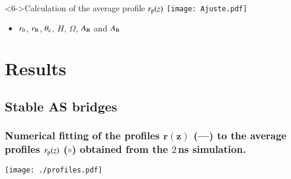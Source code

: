 \documentclass[8pt]{beamer}
\begin{document}
\begin{frame}
\begin{minipage}{0.46\textwidth}
\begin{block}
		    \end{block}  	   		
	   \end{minipage}		
	   ~~
  	   \begin{minipage}{0.505\textwidth}
  	   		\begin{block}{Calculation of the average profile $r_{\rm p}(z)$}
	    	\texttt{[image: Ajuste.pdf]}	    	
			\begin{itemize}	
				\item \small \hspace{-0.2cm} $r_{\rm 0}$, $r_{\rm B}$, $\theta_{\rm c}$, $H$, $\Omega$,\hspace{-0.025cm} $A_{\rm R}$ and $A_{\rm B}$
	        \end{itemize}	  	   		
			\end{block} 
	   \end{minipage}			   			 
\end{frame}



\section{Results}

\subsection{Stable AS bridges}


\begin{frame}
\frametitle{\textbf{Numerical fitting of the profiles $\mathbf{r(z)}$} (---) to the average profiles $r_{\rm p}(z)$ ($\circ$) obtained from the $2$\,ns simulation.}
 		\hspace{-1.cm}
	 	\begin{center}
        	\texttt{[image: ./profiles.pdf]}   
		\end{center}
        \begin{center}
	\end{center}

\end{frame}
\end{document}
